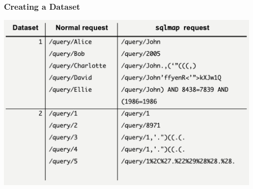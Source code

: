 \begin{frame}
\frametitle{Creating a Dataset}
\includegraphics[width=\textwidth]{res/example-requests.png}
\end{frame}